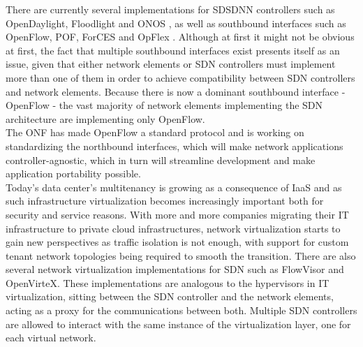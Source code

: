 There are currently several implementations for SD\gls{SDN}N controllers such as OpenDaylight, Floodlight and ONOS\cite{ControllerComparison} \cite{Kreutz2014}, as well as southbound interfaces such as OpenFlow, POF, ForCES and OpFlex \cite{Kreutz2014}.
Although at first it might not be obvious at first, the fact that multiple southbound interfaces exist presents itself as an issue, given that either network elements or \gls{SDN} controllers must implement more than one of them in order to achieve compatibility between \gls{SDN} controllers and network elements.
Because there is now a dominant southbound interface - OpenFlow - the vast majority of network elements implementing the \gls{SDN} architecture are implementing only OpenFlow.\\
%
The \gls{ONF} has made OpenFlow a standard protocol and is working on standardizing the northbound interfaces\cite{OFWP}, which will make network applications controller-agnostic, which in turn will streamline development and make application portability possible.\\
%
Today's data center's multitenancy is growing as a consequence of \gls{IaaS} and as such infrastructure virtualization becomes increasingly important both for security and service reasons.
With more and more companies migrating their \gls{IT} infrastructure to private cloud infrastructures, network virtualization starts to gain new perspectives as traffic isolation is not enough, with support for custom tenant network topologies being required to smooth the transition.
There are also several network virtualization implementations for \gls{SDN} such as FlowVisor\cite{Sherwooda}\cite{Sherwood} and OpenVirteX\cite{Kreutz2014}.
These implementations are analogous to the hypervisors in \gls{IT} virtualization, sitting between the \gls{SDN} controller and the network elements, acting as a proxy for the communications between both.
Multiple \gls{SDN} controllers are allowed to interact with the same instance of the virtualization layer, one for each virtual network.\\
%
